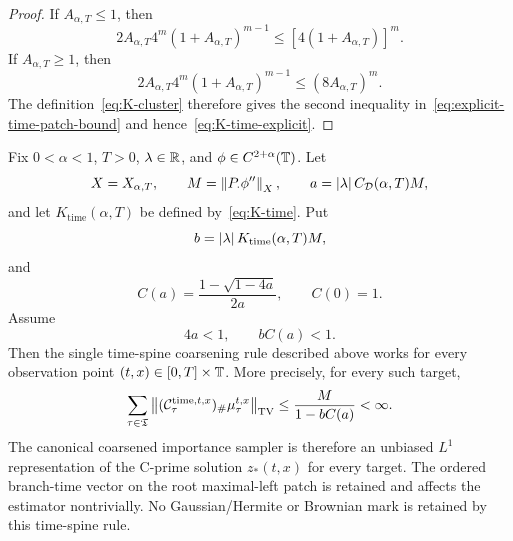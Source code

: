 \begin{proof}
If $A_{\alpha,T}\leq1$, then
\begin{equation*}
  2A_{\alpha,T}4^m(1+A_{\alpha,T})^{m-1}
  \leq
  [4(1+A_{\alpha,T})]^m.
\end{equation*}
If $A_{\alpha,T}\geq1$, then
\begin{equation*}
  2A_{\alpha,T}4^m(1+A_{\alpha,T})^{m-1}
  \leq
  (8A_{\alpha,T})^m.
\end{equation*}
The definition~\eqref{eq:K-cluster} therefore gives the second inequality in~\eqref{eq:explicit-time-patch-bound} and hence~\eqref{eq:K-time-explicit}.
\end{proof}

\begin{corollary}
\label{thm:time-spine}
Fix $0<\alpha<1$, $T>0$, $\lambda\in\mathbb R$, and $\phi\in C^{2+\alpha}(\mathbb T)$. Let
\begin{equation*}
  X=X_{\alpha,T},
  \qquad
  M=\left\lVert P_\cdot\phi''\right\rVert_X,
  \qquad
  a=\left|\lambda\right| C_{\mathcal D}(\alpha,T)M,
\end{equation*}
and let $K_{\mathrm{time}}(\alpha,T)$ be defined by~\eqref{eq:K-time}. Put
\begin{equation*}
  b
  =
  \left|\lambda\right| K_{\mathrm{time}}(\alpha,T)M,
\end{equation*}
and
\begin{equation*}
  C(a)
  =
  \frac{1-\sqrt{1-4a}}{2a},
  \qquad
  C(0)=1.
\end{equation*}
Assume
\begin{equation}
  \boxed{
  4a<1,
  \qquad
  bC(a)<1.
  }
  \label{eq:time-spine-smallness}
\end{equation}
Then the single time-spine coarsening rule described above works for every observation point $(t,x)\in[0,T]\times\mathbb T$. More precisely, for every such target,
\begin{equation}
  \sum_{\tau\in\mathfrak T}
  \left\lVert(\mathcal C_{\tau}^{\mathrm{time},t,x})_\#
  \mu_\tau^{t,x}\right\rVert_{\mathrm{TV}}
  \leq
  \frac{M}{1-bC(a)}
  <\infty.
  \label{eq:time-spine-TV-sum}
\end{equation}
The canonical coarsened importance sampler is therefore an unbiased $L^1$ representation of the C-prime solution $z_*(t,x)$ for every target. The ordered branch-time vector on the root maximal-left patch is retained and affects the estimator nontrivially. No Gaussian/Hermite or Brownian mark is retained by this time-spine rule.
\end{corollary}

